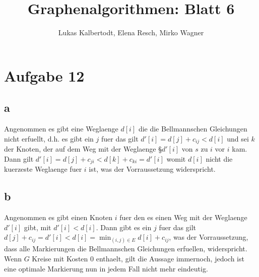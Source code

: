 \documentclass[11pt]{scrartcl} %
\title{Graphenalgorithmen: Blatt 6}
\author{Lukas Kalbertodt, Elena Resch, Mirko Wagner}
\begin{document}
\maketitle

\section*{Aufgabe 12}
\subsection*{a}
\item Angenommen es gibt eine Weglaenge $d[i]$ die die Bellmannschen Gleichungen
nicht erfuellt, d.h. es gibt ein $j$ fuer das gilt $d'[i]=d[j]+c_{ij}<d[i]$ und
sei $k$ der Knoten, der auf dem Weg mit der Weglaenge §$d'[i]$ von $s$ zu $i$ vor
$i$ kam. Dann gilt $d'[i]=d[j]+c_{ji}<d[k]+c_{ki}=d'[i]$ womit $d[i]$ nicht die
kuerzeste Weglaenge fuer $i$ ist, was der Vorraussetzung widerspricht.

\subsection*{b}
\item Angenommen es gibt einen Knoten $i$ fuer den es einen Weg mit der Weglaenge
$d'[i]$ gibt, mit $d'[i]<d[i]$. Dann gibt es ein $j$ fuer das gilt
$d[j]+c_{ij}=d'[i]<d[i]=\min_{(i,j)\in E}{d[i]+c_{ij}}$, was der Vorraussetzung,
dass alle Markierungen die Bellmannschen Gleichungen erfuellen, widerspricht.
\newline
Wenn $G$ Kreise mit Kosten 0 enthaelt, gilt die Aussage immernoch, jedoch ist
eine optimale Markierung nun in jedem Fall nicht mehr eindeutig.
\end{document}

